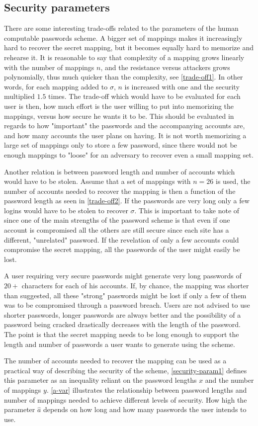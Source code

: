 \subsection{Security parameters} \label{sec-params}
\par There are some interesting trade-offs related to the parameters of the human computable passwords scheme. A bigger set of mappings makes it increasingly hard to recover the secret mapping, but it becomes equally hard to memorize and rehearse it. It is reasonable to say that complexity of a mapping grows linearly with the number of mappings $n$, and the resistance versus attackers grows polynomially, thus much quicker than the complexity, see \autoref{trade-off1}. In other words, for each mapping added to $\sigma$, $n$ is increased with one and the security multiplied $1.5$ times. The trade-off which would have to be evaluated for each user is then, how much effort is the user willing to put into memorizing the mappings, versus how secure he wants it to be. This should be evaluated in regards to how "important" the passwords and the accompanying accounts are, and how many accounts the user plans on having. It is not worth memorizing a large set of mappings only to store a few password, since there would not be enough mappings to "loose" for an adversary to recover even a small mapping set.
\par Another relation is between password length and number of accounts which would have to be stolen. Assume that a set of mappings with $n=26$ is used, the number of accounts needed to recover the mapping is then a function of the password length as seen in \autoref{trade-off2}. If the passwords are very long only a few logins would have to be stolen to recover $\sigma$. This is important to take note of since one of the main strengths of the password scheme is that even if one account is compromised all the others are still secure since each site has a different, "unrelated" password. If the revelation of only a few accounts could compromise the secret mapping, all the passwords of the user might easily be lost.
\par A user requiring very secure passwords might generate very long passwords of $20+$ characters for each of his accounts. If, by chance, the mapping was shorter than suggested, all these "strong" passwords might be lost if only a few of them was to be compromised through a password breach. Users are not advised to use shorter passwords, longer passwords are always better and the possibility of a password being cracked drastically decreases with the length of the password. The point is that the secret mapping needs to be long enough to support the length and number of passwords a user wants to generate using the scheme.
\par The number of accounts needed to recover the mapping can be used as a practical way of describing the security of the scheme, \autoref{security-param1} defines this parameter as an inequality reliant on the password lengths $x$ and the number of mappings $y$. \autoref{a-var} illustrates the relationship between password lengths and number of mappings needed to achieve different levels of security. How high the parameter $\hat a$ depends on how long and how many passwords the user intends to use. 


